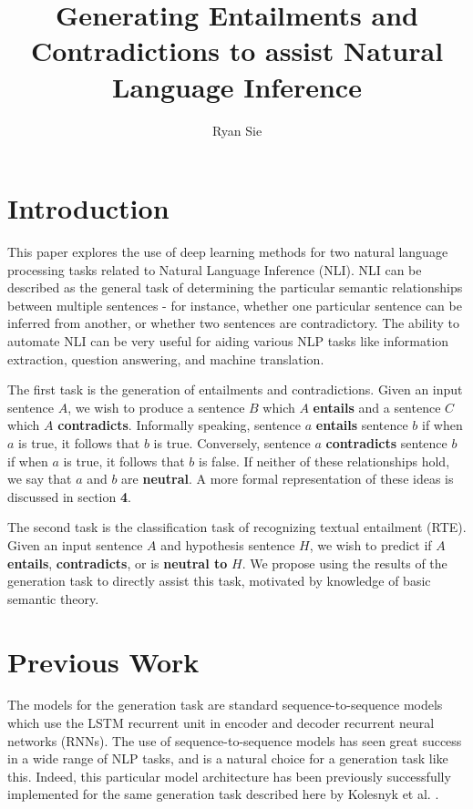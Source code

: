 \documentclass[a4paper, 12pt]{article}
\title{Generating Entailments and Contradictions to assist Natural Language Inference}
\date{}
\author{Ryan Sie}
\theoremstyle{definition}
\begin{document}
\maketitle

\section{Introduction}


This paper explores the use of deep learning methods for two natural language processing tasks related to Natural Language Inference (NLI). NLI can be described as the general task of determining the particular semantic relationships between multiple sentences - for instance, whether one particular sentence can be inferred from another, or whether two sentences are contradictory. The ability to automate NLI can be very useful for aiding various NLP tasks like information extraction, question answering, and machine translation.

\bigskip

The first task is the generation of entailments and contradictions. Given an input sentence $A$, we wish to produce a sentence $B$ which $A$ \textbf{entails} and a sentence $C$ which $A$ \textbf{contradicts}. Informally speaking, sentence $a$ \textbf{entails} sentence $b$ if when $a$ is true, it follows that $b$ is true. Conversely, sentence $a$ \textbf{contradicts} sentence $b$ if when $a$ is true, it follows that $b$ is false. If neither of these relationships hold, we say that $a$ and $b$ are \textbf{neutral}. A more formal representation of these ideas is discussed in section \textbf{4}. 

\bigskip

The second task is the classification task of recognizing textual entailment (RTE). Given an input sentence $A$ and hypothesis sentence $H$, we wish to predict if $A$ \textbf{entails}, \textbf{contradicts}, or is \textbf{neutral to} $H$. We propose using the results of the generation task to directly assist this task, motivated by knowledge of basic semantic theory.

\section{Previous Work}

The models for the generation task are standard sequence-to-sequence models \cite{seq-to-seq-sutskever} which use the LSTM \cite{lstm-schmid} recurrent unit in encoder and decoder recurrent neural networks (RNNs). The use of sequence-to-sequence models has seen great success in a wide range of NLP tasks, and is a natural choice for a generation task like this. Indeed, this particular model architecture has been previously successfully implemented for the same generation task described here by Kolesnyk et al. \cite{gen-nli-kolesnyk}.
\end{document}
